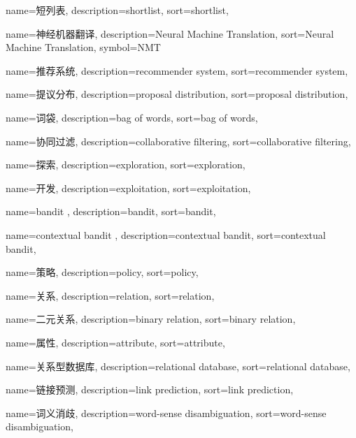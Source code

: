 {
  name=短列表,
  description={shortlist},
  sort={shortlist},
}

{
  name=神经机器翻译,
  description={Neural Machine Translation},
  sort={Neural Machine Translation},
  symbol={NMT}
}

{
  name=推荐系统,
  description={recommender system},
  sort={recommender system},
}

{
  name=提议分布,
  description={proposal distribution},
  sort={proposal distribution},
}

{
  name=词袋,
  description={bag of words},
  sort={bag of words},
}

{
  name=协同过滤,
  description={collaborative filtering},
  sort={collaborative filtering},
}

{
  name=探索,
  description={exploration},
  sort={exploration},
}

{
  name=开发,
  description={exploitation},
  sort={exploitation},
}

{
  name=bandit ,
  description={bandit},
  sort={bandit},
}

{
  name=contextual bandit ,
  description={contextual bandit},
  sort={contextual bandit},
}

{
  name=策略,
  description={policy},
  sort={policy},
}

{
  name=关系,
  description={relation},
  sort={relation},
}

{
  name=二元关系,
  description={binary relation},
  sort={binary relation},
}

{
  name=属性,
  description={attribute},
  sort={attribute},
}

{
  name=关系型数据库,
  description={relational database},
  sort={relational database},
}

{
  name=链接预测,
  description={link prediction},
  sort={link prediction},
}

{
  name=词义消歧,
  description={word-sense disambiguation},
  sort={word-sense disambiguation},
}

